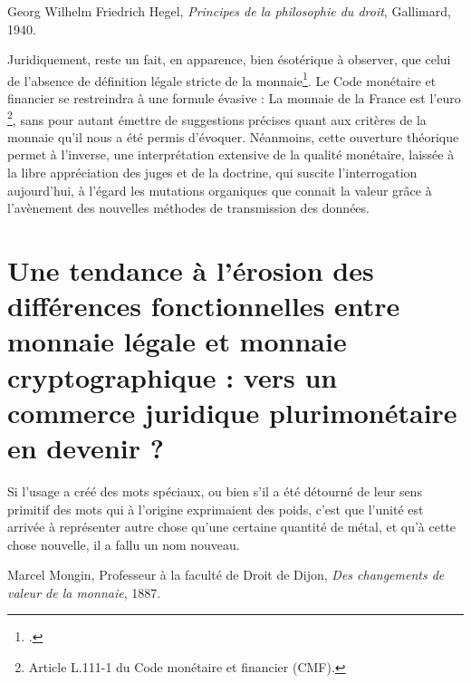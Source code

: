 {\textemdash Georg Wilhelm Friedrich Hegel, \emph{Principes de la philosophie du droit}, Gallimard, 1940.\par
\vspace{0.2cm}

Juridiquement, reste un fait, en apparence, bien ésotérique à observer, que celui de l'absence de définition légale stricte de la monnaie\footnote{.}. Le Code monétaire et financier se restreindra à une formule évasive : \og La monnaie de la France est l'euro \fg\footnote{Article L.111-1 du Code monétaire et financier (CMF).}, sans pour autant émettre de suggestions précises quant aux critères de la monnaie qu'il nous a été permis d'évoquer. Néanmoins, cette ouverture théorique permet à l'inverse, une interprétation extensive de la qualité monétaire, laissée à la libre appréciation des juges et de la doctrine, qui suscite l'interrogation aujourd'hui, à l'égard les mutations organiques que connait la valeur grâce à l'avènement des nouvelles méthodes de transmission des données. 































\chapter{Une tendance à l'érosion des différences fonctionnelles entre monnaie légale et monnaie cryptographique : vers un commerce juridique plurimonétaire en devenir ?}
\flushbottom 
{}
\og Si l'usage a créé des mots spéciaux, ou bien s'il a été détourné de leur sens primitif des mots qui à l'origine exprimaient des poids, c'est que l'unité est arrivée à représenter autre chose qu'une certaine quantité de métal, et qu'à cette chose nouvelle, il a fallu un nom nouveau.\fg\par
\textemdash Marcel Mongin, Professeur à la faculté de Droit de Dijon, \emph{Des changements de valeur de la monnaie}, 1887.\par

}
